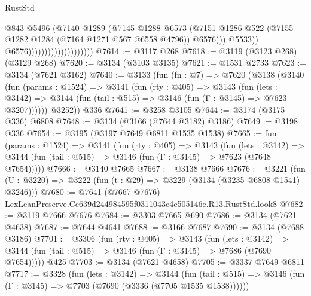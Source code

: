 \begin{lexlean}{RustStd}
\begin{coremodule}
                                                @843
                                                @5496
                                                (@7140
                                                  @1289
                                                  (@7145
                                                    @1288
                                                    @6573
                                                    (@7151
                                                      @1286
                                                      @522
                                                      (@7155
                                                        @1282
                                                        @1284
                                                        (@7164 @1271 @567 @6558 @4796))
                                                      @6576)))
                                                @5533))
                                            @6576))))))))))))))))))))
@7614 := @3117 @268
@7618 := @3119 (@3123 @268) (@3129 @268)
@7620 := @3134 (@3103 @3135)
@7621 := @1531 @2733
@7623 := @3134 (@7621 @3162)
@7640 := @3133
    (fun (fn : @7) =>
    @7620
      (@3138
        (@3140
          (fun (params : @1524) =>
          @3141
            (fun (rty : @405) =>
            @3143
              (fun (lets : @3142) =>
              @3144 (fun (tail : @515) => @3146 (fun (Γ : @3145) => @7623 @3207))))))
        @3252))
    @336
@7641 := @3258 @3105
@7644 := @3174 (@3175 @336) @6808
@7648 := @3134 (@3166 (@7644 @3182) @3186)
@7649 := @3198 @336
@7654 := @3195 (@3197 @7649 @6811 @1535 @1538)
@7665 := fun (params : @1524) =>
  @3141
    (fun (rty : @405) =>
    @3143
      (fun (lets : @3142) =>
      @3144 (fun (tail : @515) => @3146 (fun (Γ : @3145) => @7623 (@7648 @7654)))))
@7666 := @3140 @7665
@7667 := @3138 @7666
@7676 := @3221 (fun (U : @3220) => @3222 (fun (t : @29) => @3229 (@3134 (@3235 @6808 @1541) @3246)))
@7680 := @7641 (@7667 @7676) LexLeanPreserve.Cc639d244984595f0311043c4c505146e.R13.RustStd.look8
@7682 := @3119 @7666 @7676
@7684 := @3303 @7665 @690
@7686 := @3134 (@7621 @4638)
@7687 := @7644 @4641
@7688 := @3166 @7687
@7690 := @3134 (@7688 @3186)
@7701 := @3306
    (fun (rty : @405) =>
    @3143
      (fun (lets : @3142) =>
      @3144 (fun (tail : @515) => @3146 (fun (Γ : @3145) => @7686 (@7690 @7654)))))
    @425
@7703 := @3134 (@7621 @4658)
@7705 := @3337 @7649 @6811
@7717 := @3328
    (fun (lets : @3142) =>
    @3144
      (fun (tail : @515) => @3146 (fun (Γ : @3145) => @7703 (@7690 (@3336 (@7705 @1535 @1538))))))

\end{coremodule}
\end{lexlean}
